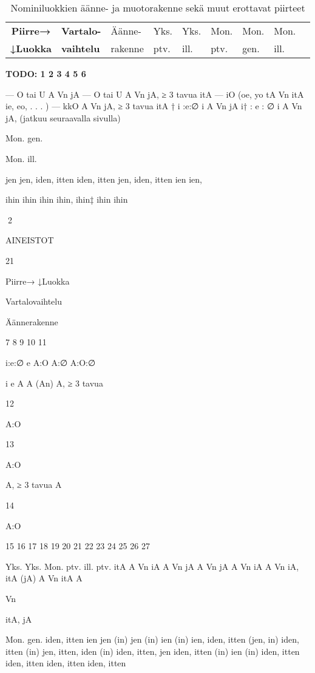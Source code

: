 \documentclass[free]{flammie}
\begin{document}
\begin{table}
        \caption{Nominiluokkien äänne- ja muotorakenne sekä
        muut erottavat piirteet}
    \begin{tabular}{|c||l|l|l|lll|l|l|}
        \hline
        \bf Piirre→ &
        \bf Vartalo- & Äänne- & Yks. & Yks. & Mon. & Mon. & Mon. \\
        \bf ↓Luokka &
        \bf vaihtelu & rakenne & ptv. & ill. & ptv.& gen. & ill. \\
        \hline
        \hline
    \end{tabular}
    \bf TODO:
1
2
3
4
5
6

—
O tai U
A
Vn
jA
—
O tai U
A
Vn
jA,
≥ 3 tavua
itA
—
iO (oe, yo tA
Vn
itA
ie, eo, . . . )
—
kkO
A
Vn
jA,
≥ 3 tavua
itA
†
i :e:∅
i
A
Vn
jA
i† : e : ∅
i
A
Vn
jA,
(jatkuu seuraavalla sivulla)

Mon.
gen.

Mon.
ill.

jen
jen,
iden, itten
iden,
itten
jen,
iden, itten
ien
ien,

ihin
ihin
ihin
ihin,
ihin‡
ihin
ihin

2

AINEISTOT

21

Piirre→
↓Luokka

Vartalovaihtelu

Äännerakenne

7
8
9
10
11

i:e:∅
e
A:O
A:∅
A:O:∅

i
e
A
A (An)
A,
≥ 3 tavua

12

A:O

13

A:O

A,
≥ 3 tavua
A

14

A:O

15
16
17
18
19
20
21
22
23
24
25
26
27

Yks. Yks. Mon.
ptv. ill.
ptv.
itA
A
Vn
iA
A
Vn
jA
A
Vn
jA
A
Vn
iA
A
Vn
iA,
itA
(jA)
A
Vn
itA
A

Vn

itA,
jA

Mon.
gen.
iden, itten
ien
jen (in)
jen (in)
ien (in)
ien, iden,
itten
(jen, in)
iden,
itten (in)
jen,
itten,
iden (in)
iden,
itten,
jen
iden,
itten (in)
ien (in)
iden,
itten
iden,
itten
iden,
itten
iden,
itten


\end{table}
\end{document}
